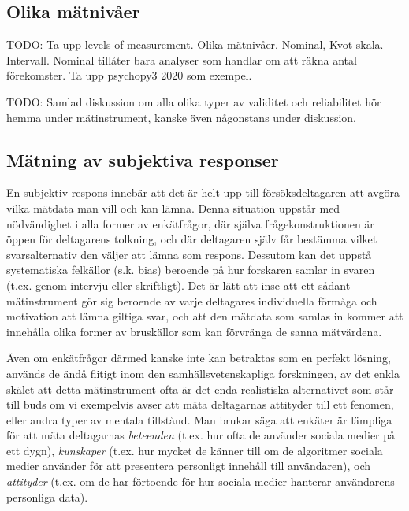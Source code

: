 \documentclass[
]{book}
\begin{document}
\hypertarget{sub07.3.1}{%
\subsection{Olika mätnivåer}\label{sub07.3.1}}

TODO: Ta upp levels of measurement. Olika mätnivåer. Nominal, Kvot-skala. Intervall. Nominal tillåter bara analyser som handlar om att räkna antal förekomster. Ta upp psychopy3 2020 som exempel.

TODO: Samlad diskussion om alla olika typer av validitet och reliabilitet hör hemma under mätinstrument, kanske även någonstans under diskussion.

\hypertarget{sub07.3.2}{%
\subsection{Mätning av subjektiva responser}\label{sub07.3.2}}

En subjektiv respons innebär att det är helt upp till försöksdeltagaren att avgöra vilka mätdata man vill och kan lämna. Denna situation uppstår med nödvändighet i alla former av enkätfrågor, där själva frågekonstruktionen är öppen för deltagarens tolkning, och där deltagaren själv får bestämma vilket svarsalternativ den väljer att lämna som respons. Dessutom kan det uppstå systematiska felkällor (s.k. bias) beroende på hur forskaren samlar in svaren (t.ex. genom intervju eller skriftligt). Det är lätt att inse att ett sådant mätinstrument gör sig beroende av varje deltagares individuella förmåga och motivation att lämna giltiga svar, och att den mätdata som samlas in kommer att innehålla olika former av bruskällor som kan förvränga de sanna mätvärdena.

Även om enkätfrågor därmed kanske inte kan betraktas som en perfekt lösning, används de ändå flitigt inom den samhällsvetenskapliga forskningen, av det enkla skälet att detta mätinstrument ofta är det enda realistiska alternativet som står till buds om vi exempelvis avser att mäta deltagarnas attityder till ett fenomen, eller andra typer av mentala tillstånd. Man brukar säga att enkäter är lämpliga för att mäta deltagarnas \emph{beteenden} (t.ex. hur ofta de använder sociala medier på ett dygn), \emph{kunskaper} (t.ex. hur mycket de känner till om de algoritmer sociala medier använder för att presentera personligt innehåll till användaren), och \emph{attityder} (t.ex. om de har förtoende för hur sociala medier hanterar användarens personliga data).
\end{document}
